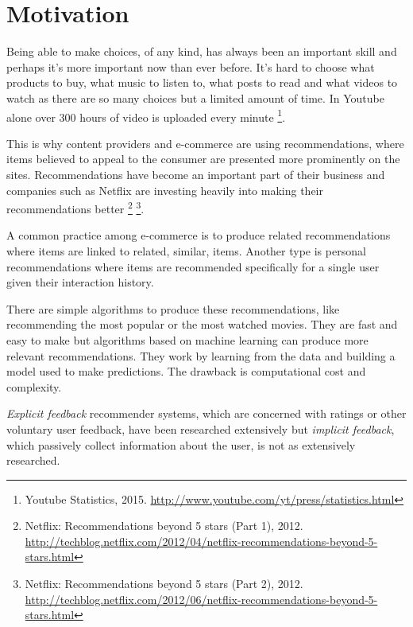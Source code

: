 
\section{Motivation}\label{sec:intro:motivation}

Being able to make choices, of any kind, has always been an important skill and perhaps it's more important now than ever before. It's hard to choose what products to buy, what music to listen to, what posts to read and what videos to watch as there are so many choices but a limited amount of time. In Youtube alone over 300 hours of video is uploaded every minute
\footnote{Youtube Statistics, 2015. \url{http://www.youtube.com/yt/press/statistics.html}}.

This is why content providers and e-commerce are using recommendations, where items believed to appeal to the consumer are presented more prominently on the sites. Recommendations have become an important part of their business and companies such as Netflix are investing heavily into making their recommendations better
\footnote{ Netflix: Recommendations beyond 5 stars (Part 1), 2012. \url{http://techblog.netflix.com/2012/04/netflix-recommendations-beyond-5-stars.html} }
\footnote{ Netflix: Recommendations beyond 5 stars (Part 2), 2012. \url{http://techblog.netflix.com/2012/06/netflix-recommendations-beyond-5-stars.html} }.

A common practice among e-commerce is to produce related recommendations where items are linked to related, similar, items. Another type is personal recommendations where items are recommended specifically for a single user given their interaction history.

There are simple algorithms to produce these recommendations, like recommending the most popular or the most watched movies. They are fast and easy to make but algorithms based on machine learning can produce more relevant recommendations. They work by learning from the data and building a model used to make predictions. The drawback is computational cost and complexity.

\textit{Explicit feedback} recommender systems, which are concerned with ratings or other voluntary user feedback, have been researched extensively but \textit{implicit feedback}, which passively collect information about the user, is not as extensively researched. \citep{hu2008collaborative, bobadilla2013recommender}

